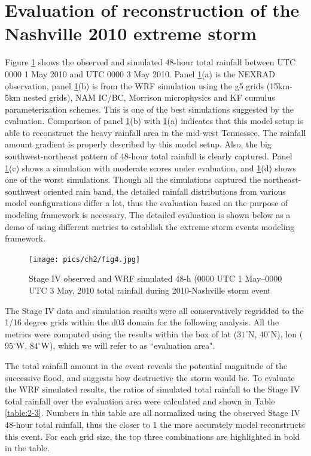 \section{Evaluation of reconstruction of the Nashville 2010 extreme storm}

Figure \ref{fig:2-4} shows the observed and simulated 48-hour total rainfall between UTC 0000 1 May 2010 and UTC 0000 3 May 2010. Panel \ref{fig:2-4}(a) is the NEXRAD observation, panel \ref{fig:2-4}(b) is from the WRF simulation using the g5 grids (15km-5km nested grids), NAM IC/BC, Morrison microphysics and KF cumulus parameterization schemes. This is one of the best simulations suggested by the evaluation. Comparison of panel \ref{fig:2-4}(b) with \ref{fig:2-4}(a) indicates that this model setup is able to reconstruct the heavy rainfall area in the mid-west Tennessee. The rainfall amount gradient is properly described by this model setup. Also, the big southwest-northeast pattern of 48-hour total rainfall is clearly captured. Panel \ref{fig:2-4}(c) shows a simulation with moderate scores under evaluation, and \ref{fig:2-4}(d) shows one of the worst simulations. Though all the simulations captured the northeast-southwest oriented rain band, the detailed rainfall distributions from various model configurations differ a lot, thus the evaluation based on the purpose of modeling framework is necessary. The detailed evaluation is shown below as a demo of using different metrics to establish the extreme storm events modeling framework.

\begin{figure}
  \texttt{[image: pics/ch2/fig4.jpg]}
  \caption{Stage IV observed and WRF simulated 48-h (0000 UTC 1 May–0000 UTC 3 May, 2010 total rainfall during 2010-Nashville storm event}
  \label{fig:2-4}
\end{figure}

The Stage IV data and simulation results were all conservatively regridded to the 1/16 degree grids within the d03 domain for the following analysis. All the metrics were computed using the results within the box of lat ($31^{\circ}$N, $40^{\circ}$N), lon ($95^{\circ}$W, $84^{\circ}$W), which we will refer to as ``evaluation area".

The total rainfall amount in the event reveals the potential magnitude of the successive flood, and suggests how destructive the storm would be. To evaluate the WRF simulated results, the ratios of simulated total rainfall to the Stage IV total rainfall over the evaluation area were calculated and shown in Table \ref{table:2-3}. Numbers in this table are all normalized using the observed Stage IV 48-hour total rainfall, thus the closer to 1 the more accurately model reconstructs this event. For each grid size, the top three combinations are highlighted in bold in the table.

